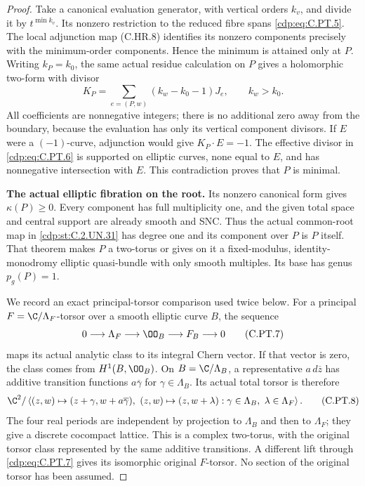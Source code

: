 \begin{proof}
Take a canonical evaluation generator, with vertical orders
$k_v$, and divide it by $t^{\min k_v}$. Its nonzero restriction
to the reduced fibre spans \eqref{cdp:eq:C.PT.5}. The local adjunction map
(C.HR.8) identifies its nonzero components precisely with the
minimum-order components. Hence the minimum is attained
only at $P$. Writing $k_P=k_0$, the same actual residue
calculation on $P$ gives a holomorphic two-form with divisor
\[
          K_P=\sum_{e=(P,w)}(k_w-k_0-1)J_e,\qquad
                          k_w>k_0.
 \tag{C.PT.6}\label{cdp:eq:C.PT.6}
\]
All coefficients are nonnegative integers; there is no
additional zero away from the boundary, because the
evaluation has only its vertical component divisors.
If $E$ were a $(-1)$-curve, adjunction would give
$K_P\cdot E=-1$. The effective divisor in \eqref{cdp:eq:C.PT.6}
is supported on elliptic curves, none equal to $E$,
and has nonnegative intersection with $E$. This
contradiction proves that $P$ is minimal.

\par\medskip\noindent\textbf{The actual elliptic fibration on the root.}
Its nonzero canonical form gives $\kappa(P)\ge0$.
Every component has full multiplicity one, and the
given total space and central support are already
smooth and SNC. Thus the actual common-root map in
\ref{cdp:st:C.2.UN.31} has degree one and its component over $P$ is
$P$ itself. That theorem makes $P$ a two-torus or
gives on it a fixed-modulus, identity-monodromy
elliptic quasi-bundle with only smooth multiples.
Its base has genus $p_g(P)=1$.

We record an exact principal-torsor comparison used twice
below. For a principal $F=\C/\Lambda_F$-torsor over a
smooth elliptic curve $B$, the sequence
\[
 0\longrightarrow\Lambda_F
 \longrightarrow\OO_B\longrightarrow F_B
 \longrightarrow0
 \tag{C.PT.7}\label{cdp:eq:C.PT.7}
\]
maps its actual analytic class to its integral Chern
vector. If that vector is zero, the class comes from
$H^1(B,\OO_B)$. On $B=\C/\Lambda_B$, a representative
$a\,d\overline z$ has additive transition functions
$a\overline\gamma$ for $\gamma\in\Lambda_B$.
Its actual total torsor is therefore
\[
 \C^2/
 \left\langle
  (z,w)\mapsto(z+\gamma,w+a\overline\gamma),\
  (z,w)\mapsto(z,w+\lambda):
   \gamma\in\Lambda_B,\ \lambda\in\Lambda_F
 \right\rangle .
 \tag{C.PT.8}\label{cdp:eq:C.PT.8}
\]
The four real periods are independent by projection
to $\Lambda_B$ and then to $\Lambda_F$; they give
a discrete cocompact lattice. This is a complex
two-torus, with the original torsor class represented
by the same additive transitions. A different lift
through \eqref{cdp:eq:C.PT.7} gives its isomorphic original
$F$-torsor. No section of the original torsor has
been assumed.


\end{proof}
